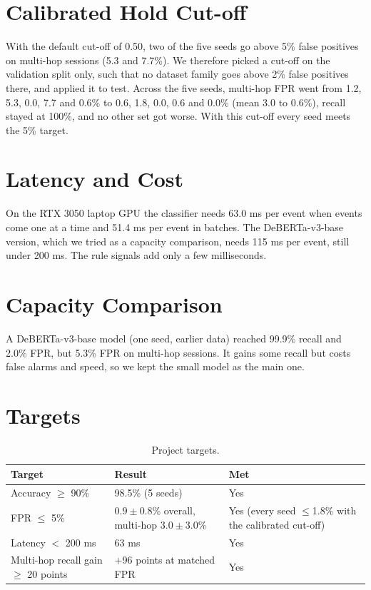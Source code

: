 \section{Calibrated Hold Cut-off}
With the default cut-off of 0.50, two of the five seeds go above 5\% false positives on multi-hop sessions (5.3 and 7.7\%). We therefore picked a cut-off on the validation split only, such that no dataset family goes above 2\% false positives there, and applied it to test. Across the five seeds, multi-hop FPR went from 1.2, 5.3, 0.0, 7.7 and 0.6\% to 0.6, 1.8, 0.0, 0.6 and 0.0\% (mean 3.0 to 0.6\%), recall stayed at 100\%, and no other set got worse. With this cut-off every seed meets the 5\% target.

\section{Latency and Cost}
On the RTX 3050 laptop GPU the classifier needs 63.0 ms per event when events come one at a time and 51.4 ms per event in batches. The DeBERTa-v3-base version, which we tried as a capacity comparison, needs 115 ms per event, still under 200 ms. The rule signals add only a few milliseconds.

\section{Capacity Comparison}
A DeBERTa-v3-base model (one seed, earlier data) reached 99.9\% recall and 2.0\% FPR, but 5.3\% FPR on multi-hop sessions. It gains some recall but costs false alarms and speed, so we kept the small model as the main one.

\section{Targets}
\begin{table}[H]
\centering\small
\begin{tabular}{p{4.2cm}p{6.6cm}p{3.2cm}}
\toprule
Target & Result & Met\\
\midrule
Accuracy $\ge$ 90\% & 98.5\% (5 seeds) & Yes\\
FPR $\le$ 5\% & $0.9\pm0.8$\% overall, multi-hop $3.0\pm3.0$\% & Yes (every seed $\le$1.8\% with the calibrated cut-off)\\
Latency $<$ 200 ms & 63 ms & Yes\\
Multi-hop recall gain $\ge$ 20 points & +96 points at matched FPR & Yes\\
\bottomrule
\end{tabular}
\caption{Project targets.}
\end{table}

